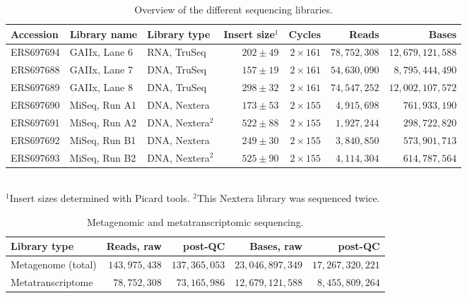 \documentclass{bmcart}
\begin{document}
\begin{backmatter}
\begin{table}[h!]
\caption{Overview of the different sequencing libraries.}
\begin{tabular}{lllrrrr}
\hline
Accession & Library name & Library type & Insert size$^{1}$ & Cycles & Reads & Bases \\
\hline
ERS697694 & GAIIx, Lane 6 & RNA, TruSeq & $202 \pm 49$ & $2 \times 161$ & $78,752,308$ & $12,679,121,588$ \\
ERS697688 & GAIIx, Lane 7 & DNA, TruSeq & $157 \pm 19$ & $2 \times 161$ & $54,630,090$ & $8,795,444,490$ \\
ERS697689 & GAIIx, Lane 8 & DNA, TruSeq & $298 \pm 32$ & $2 \times 161$ & $74,547,252$ & $12,002,107,572$ \\
ERS697690 & MiSeq, Run A1 & DNA, Nextera & $173 \pm 53$ & $2 \times 155$ & $4,915,698$ & $761,933,190$ \\
ERS697691 & MiSeq, Run A2 & DNA, Nextera$^{2}$ & $522 \pm 88$ & $2 \times 155$ & $1,927,244$ & $298,722,820$ \\
ERS697692 & MiSeq, Run B1 & DNA, Nextera & $249 \pm 30$ & $2 \times 155$ & $3,840,850$ & $573,901,713$ \\
ERS697693 & MiSeq, Run B2 & DNA, Nextera$^{2}$ & $525 \pm 90$ & $2 \times 155$ & $4,114,304$ & $614,787,564$ \\
\hline
\end{tabular}
\\{$^{1}$Insert sizes determined with Picard tools. $^{2}$This Nextera library was sequenced twice.}
\label{tReads}
\end{table}

\begin{table}[h!]
\caption{Metagenomic and metatranscriptomic sequencing.}
\begin{tabular}{lrrrr}
\hline
Library type & Reads, raw & post-QC & Bases, raw & post-QC\\
\hline
Metagenome (total) & $143,975,438$ & $137,365,053$ & $23,046,897,349$ & $17,267,320,221$ \\
Metatranscriptome & $78,752,308$ & $73,165,986$ & $12,679,121,588$ & $8,455,809,264$ \\
\hline
\end{tabular}
\label{tPostQC}
\end{table}


\end{backmatter}
\end{document}

